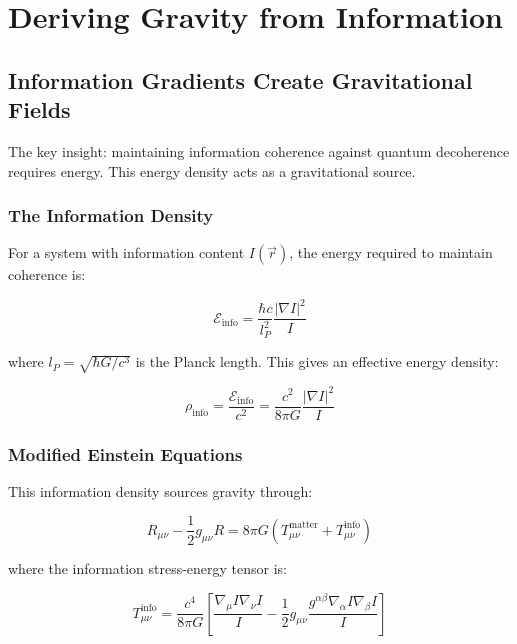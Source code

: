 \documentclass[12pt,letterpaper]{article}
\begin{document}
\newpage

\section{Deriving Gravity from Information}

\subsection{Information Gradients Create Gravitational Fields}

The key insight: maintaining information coherence against quantum decoherence requires energy. This energy density acts as a gravitational source.

\subsubsection{The Information Density}

For a system with information content $I(\vec{r})$, the energy required to maintain coherence is:

\begin{equation}
\mathcal{E}_{\text{info}} = \frac{\hbar c}{l_P^2} \frac{|\nabla I|^2}{I}
\end{equation}

where $l_P = \sqrt{\hbar G/c^3}$ is the Planck length. This gives an effective energy density:

\begin{equation}
\rho_{\text{info}} = \frac{\mathcal{E}_{\text{info}}}{c^2} = \frac{c^2}{8\pi G} \frac{|\nabla I|^2}{I}
\end{equation}

\subsubsection{Modified Einstein Equations}

This information density sources gravity through:

\begin{equation}
R_{\mu\nu} - \frac{1}{2}g_{\mu\nu}R = 8\pi G(T_{\mu\nu}^{\text{matter}} + T_{\mu\nu}^{\text{info}})
\end{equation}

where the information stress-energy tensor is:

\begin{equation}
T_{\mu\nu}^{\text{info}} = \frac{c^4}{8\pi G}\left[\frac{\nabla_\mu I \nabla_\nu I}{I} - \frac{1}{2}g_{\mu\nu}\frac{g^{\alpha\beta}\nabla_\alpha I \nabla_\beta I}{I}\right]
\end{equation}
\end{document}
